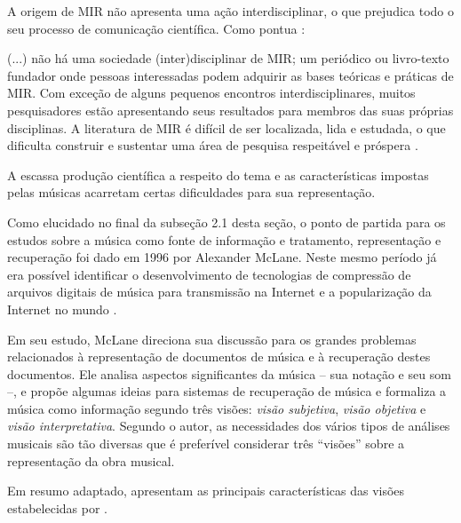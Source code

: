 A origem de MIR não apresenta uma ação interdisciplinar, o que prejudica todo o seu processo de comunicação científica. Como pontua :

\begin{citacao}
(...) não há uma sociedade (inter)disciplinar de MIR; um periódico ou livro-texto fundador onde pessoas interessadas podem adquirir as bases teóricas e práticas de MIR. Com exceção de alguns pequenos encontros interdisciplinares, muitos pesquisadores estão apresentando seus resultados para membros das suas próprias disciplinas. A literatura de MIR é difícil de ser localizada, lida e estudada, o que dificulta construir e sustentar uma área de pesquisa respeitável e próspera \cite{santini&souza2007}.
\end{citacao}

A escassa produção científica a respeito do tema e as características impostas pelas músicas acarretam certas dificuldades para sua representação.

Como elucidado no final da subseção 2.1 desta seção, o ponto de partida para os estudos sobre a música como fonte de informação e tratamento, representação e recuperação foi dado em 1996 por Alexander McLane. Neste mesmo período já era possível identificar o desenvolvimento de tecnologias de compressão de arquivos digitais de música para transmissão na Internet e a popularização da Internet no mundo \cite{santini&souza2007}.

Em seu estudo, McLane direciona sua discussão para os grandes problemas relacionados à representação de documentos de música e à recuperação destes documentos. Ele analisa aspectos significantes da música – sua notação e seu som –, e propõe algumas ideias para sistemas de recuperação de música e formaliza a música como informação segundo três visões: \textit{visão subjetiva}, \textit{visão objetiva} e \textit{visão interpretativa}. Segundo o autor, as necessidades dos vários tipos de análises musicais são tão diversas que é preferível considerar três “visões” sobre a representação da obra musical.

Em resumo adaptado,  apresentam as principais características das visões estabelecidas por .

